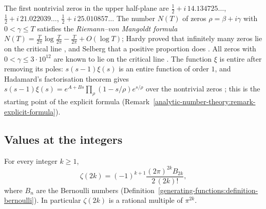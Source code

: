 \begin{remark}\label{analytic-number-theory:remark-zeros-numerics}
The first nontrivial zeros in the upper half-plane are $\frac12 + i\,14.134725\ldots$, $\frac12 + i\,21.022039\ldots$, $\frac12 + i\,25.010857\ldots$ The number $N(T)$ of zeros $\rho = \beta + i\gamma$ with
$0 < \gamma \leq T$ satisfies the \emph{Riemann--von Mangoldt formula} $N(T) = \frac{T}{2\pi}\log\frac{T}{2\pi} - \frac{T}{2\pi} + O(\log T)$; Hardy proved that infinitely many zeros lie on the critical
line \cite{hardy-1914-zeros}, and Selberg that a positive proportion does \cite{titchmarsh-zeta}. All zeros with $0 < \gamma \leq 3 \cdot 10^{12}$ are known to lie on the critical line
\cite{platt-trudgian}. The function $\xi$ is entire after removing its poles: $s(s - 1)\xi(s)$ is an entire function of order $1$, and Hadamard's factorisation theorem gives
$s(s - 1)\xi(s) = e^{A + Bs}\prod_\rho(1 - s/\rho)e^{s/\rho}$ over the nontrivial zeros \cite{davenport-multiplicative}; this is the starting point of the explicit formula
(Remark~\ref{analytic-number-theory:remark-explicit-formula}).
\end{remark}

\subsection{Values at the integers}\label{analytic-number-theory:subsection-zeta-values}

\begin{theorem}[Euler]\label{analytic-number-theory:theorem-zeta-even}
For every integer $k \geq 1$,
\[
\zeta(2k) = (-1)^{k+1}\frac{(2\pi)^{2k}B_{2k}}{2\,(2k)!},
\]
where $B_n$ are the Bernoulli numbers (Definition~\ref{generating-functions:definition-bernoulli}). In particular $\zeta(2k)$ is a rational multiple of $\pi^{2k}$.
\end{theorem}

